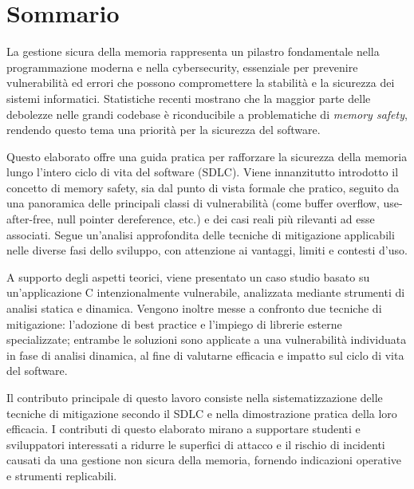 \chapter*{Sommario}
\label{cha:sommario}

La gestione sicura della memoria rappresenta un pilastro fondamentale nella
programmazione moderna e nella cybersecurity, essenziale per prevenire vulnerabilità
ed errori che possono compromettere la stabilità e la sicurezza dei sistemi informatici.
Statistiche recenti mostrano che la maggior parte delle debolezze nelle grandi
codebase è riconducibile a problematiche di \textit{memory safety}, rendendo
questo tema una priorità per la sicurezza del software.

\vspace{0.5em}
\noindent
Questo elaborato offre una guida pratica per rafforzare la sicurezza della
memoria lungo l'intero ciclo di vita del software (SDLC). Viene innanzitutto introdotto
il concetto di memory safety, sia dal punto di vista formale che pratico, seguito
da una panoramica delle principali classi di vulnerabilità (come buffer overflow,
use-after-free, null pointer dereference, etc.) e dei casi reali più rilevanti ad
esse associati. Segue un'analisi approfondita delle tecniche di mitigazione
applicabili nelle diverse fasi dello sviluppo, con attenzione ai vantaggi,
limiti e contesti d'uso.

\vspace{0.5em}
\noindent
A supporto degli aspetti teorici, viene presentato un caso studio basato su un'applicazione
C intenzionalmente vulnerabile, analizzata mediante strumenti di analisi statica
e dinamica. Vengono inoltre messe a confronto due tecniche di mitigazione: l'adozione
di best practice e l'impiego di librerie esterne specializzate; entrambe le soluzioni
sono applicate a una vulnerabilità individuata in fase di analisi dinamica, al
fine di valutarne efficacia e impatto sul ciclo di vita del software.

\vspace{0.5em}
\noindent
Il contributo principale di questo lavoro consiste nella sistematizzazione delle
tecniche di mitigazione secondo il SDLC e nella dimostrazione pratica della loro
efficacia. I contributi di questo elaborato mirano a supportare studenti e sviluppatori
interessati a ridurre le superfici di attacco e il rischio di incidenti causati da
una gestione non sicura della memoria, fornendo indicazioni operative e
strumenti replicabili.